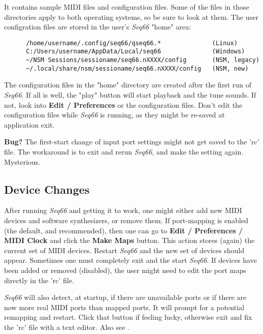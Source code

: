    It contains sample MIDI files and configuration files.
   Some of the files in those directories apply to both operating systems, so
   be sure to look at them.
   The user configration files are stored in the user's
   \textsl{Seq66} "home" area:

   \begin{verbatim}
      /home/username/.config/seq66/qseq66.*              (Linux)
      C:/Users/username/AppData/Local/seq66              (Windows)
      ~/NSM Sessions/sessioname/seq66.nXXXX/config       (NSM, legacy)
      ~/.local/share/nsm/sessioname/seq66.nXXXX/config   (NSM, new)
   \end{verbatim}

   The configuration files in the "home" directory
   are created after the first run of \textsl{Seq66}.
   If all is well, the "play" button will start playback and the tune sounds.
   If not, look into \textbf{Edit / Preferences} or the configuration files.
   Don't edit the configuration files while \textsl{Seq66} is running, as
   they might be re-saved at application exit.

   \textbf{Bug?}
      The first-start change of input port settings might not get saved
      to the 'rc' file. The workaround is to exit and rerun
      \textsl{Seq66}, and make the setting again.
      Mysterious.

\subsection{Device Changes}
\label{subsec:introduction_device_changes}

   After running \textsl{Seq66} and getting it to work, one might
   either add new MIDI devices and software synthesizers, or remove
   them.
   If port-mapping is enabled (the default, and recommended), then
   one can go to
   \textbf{Edit / Preferences / MIDI Clock} and
   click the \textbf{Make Maps} button.
   This action stores (again) the current set of MIDI devices.
   Restart \textsl{Seq66} and the new set of devices should appear.
   Sometimes one must completely exit and the start \textsl{Seq66}.
   If devices have been added or removed (disabled), the user
   might need to edit the port maps directly in the 'rc' file.

   \textsl{Seq66} will also detect, at startup, if there are unavailable
   ports or if there are now more real MIDI ports than mapped ports.
   It will prompt for a potential remapping and restart.
   Click that button if feeling lucky, otherwise
   exit and fix the 'rc' file with a text editor.
   Also see .

